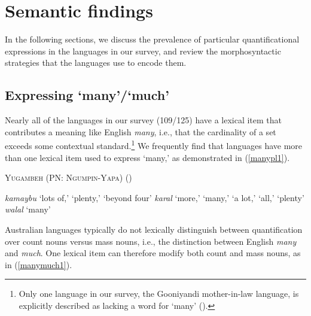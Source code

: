 \documentclass[12pt,egregdoesnotlikesansseriftitles]{scrartcl}
\newcommand{\ofy}{/125} %
\begin{document}
\section{Semantic findings \label{individquantsection}}

In the following sections, we discuss the prevalence of particular quantificational expressions in the languages in our survey, and review the morphosyntactic strategies that the languages use to encode them.

\subsection{Expressing `many'/`much' \label{manymuchsection}}

Nearly all of the languages in our survey (109\ofy) have a lexical item that contributes a meaning like English \textit{many}, i.e., that the cardinality of a set exceeds some contextual standard.\footnote{Only one language in our survey, the Gooniyandi mother-in-law language, is explicitly described as lacking a word for `many' (\citealt[636]{mcgregor89}).} We frequently find that languages  have more than one lexical item used to express `many,' as demonstrated in (\ref{manypl1}). %

\begin{exe}
  \ex  \textsc{Yugambeh (PN: Ngumpin-Yapa)} \hfill(\citealt{sharpe98}) \label{manypl1}
  \begin{xlist}
    \ex \textit{kamaybu} `lots of,' `plenty,' `beyond four'
    \ex \textit{karal} `more,' `many,' `a lot,' `all,' `plenty'
    \ex \textit{walal}  `many' 
  \end{xlist} 
\end{exe}

Australian languages typically do not lexically distinguish between quantification over count nouns versus mass nouns, i.e., the distinction between English \textit{many} and \textit{much}. One lexical item can therefore modify both count and mass nouns, as in (\ref{manymuch1}).
\end{document}
